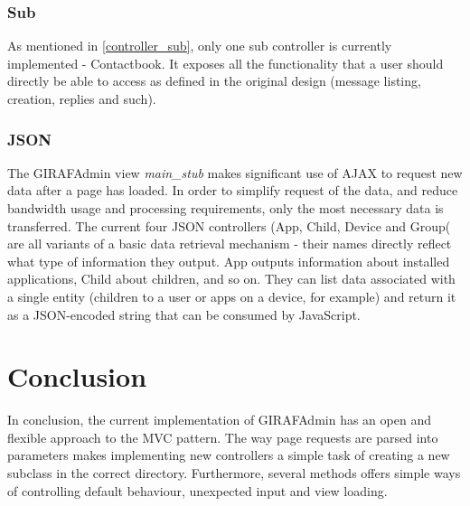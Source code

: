 \subsubsection*{Sub}
As mentioned in \vref{controller_sub}, only one sub controller is currently implemented - Contactbook. It exposes all the functionality that a user should directly be able to access as defined in the original design (message listing, creation, replies and such).

\subsubsection*{JSON}
The GIRAFAdmin view \emph{main\_stub} makes significant use of AJAX to request new data after a page has loaded. In order to simplify request of the data, and reduce bandwidth usage and processing requirements, only the most necessary data is transferred. The current four JSON controllers (App, Child, Device and Group( are all variants of a basic data retrieval mechanism - their names directly reflect what type of information they output. App outputs information about installed applications, Child about children, and so on. They can list data associated with a single entity (children to a user or apps on a device, for example) and return it as a JSON-encoded string that can be consumed by JavaScript.

\section{Conclusion}
In conclusion, the current implementation of GIRAFAdmin has an open and flexible approach to the MVC pattern. The way page requests are parsed into parameters makes implementing new controllers a simple task of creating a new subclass in the correct directory. Furthermore, several methods offers simple ways of controlling default behaviour, unexpected input and view loading.